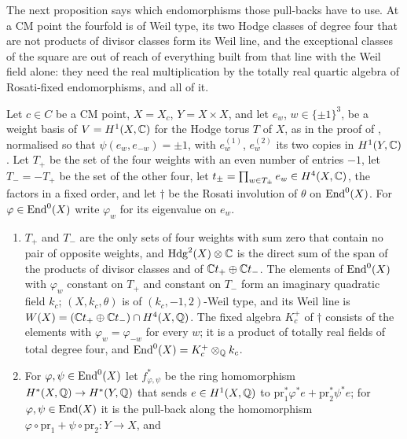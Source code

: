 The next proposition says which endomorphisms those pull-backs have to use.
At a CM point the fourfold is of Weil type, its two Hodge classes of degree
four that are not products of divisor classes form its Weil line, and the
exceptional classes of the square are out of reach of everything built from
that line with the Weil field alone: they need the real multiplication by the
totally real quartic algebra of Rosati-fixed endomorphisms, and all of it.

\begin{proposition}\label{prop:cmsource}
Let $c\in C$ be a CM point, $X=X_{c}$, $Y=X\times X$, and let $e_{w}$,
$w\in\{\pm1\}^{3}$, be a weight basis of $V=H^{1}(X,\mathbb{C})$ for the Hodge torus
$T$ of $X$, as in the proof of , normalised so that
$\psi(e_{w},e_{-w})=\pm1$, with $e^{(1)}_{w}$, $e^{(2)}_{w}$ its two copies in
$H^{1}(Y,\mathbb{C})$. Let $T_{+}$ be the set of the four weights with an even
number of entries $-1$, let $T_{-}=-T_{+}$ be the set of the other four, let
$t_{\pm}=\prod_{w\in T_{\pm}}e_{w}\in H^{4}(X,\mathbb{C})$, the factors in a fixed
order, and let $\dagger$ be the Rosati involution of $\theta$ on
$\operatorname{End}^{0}(X)$. For $\varphi\in\operatorname{End}^{0}(X)$ write $\varphi_{w}$ for its
eigenvalue on $e_{w}$.
\begin{enumerate}[label=\textup{(\roman*)},leftmargin=2.6em,itemsep=2pt]
\item $T_{+}$ and $T_{-}$ are the only sets of four weights with sum zero
  that contain no pair of opposite weights, and $\mathrm{Hdg}^{2}(X)\otimes\mathbb{C}$ is
  the direct sum of the span of the products of divisor classes and of
  $\mathbb{C} t_{+}\oplus\mathbb{C} t_{-}$. The elements of $\operatorname{End}^{0}(X)$ with
  $\varphi_{w}$ constant on $T_{+}$ and constant on $T_{-}$ form an imaginary
  quadratic field $k_{c}$; $(X,k_{c},\theta)$ is of $(k_{c},-1,2)$-Weil type,
  and its Weil line is $W(X)=(\mathbb{C} t_{+}\oplus\mathbb{C} t_{-})\cap H^{4}(X,\mathbb{Q})$.
  The fixed algebra $K_{c}^{+}$ of $\dagger$ consists of the elements with
  $\varphi_{w}=\varphi_{-w}$ for every $w$; it is a product of totally real
  fields of total degree four, and $\operatorname{End}^{0}(X)=K_{c}^{+}\otimes_{\mathbb{Q}}k_{c}$.
\item For $\varphi,\psi\in\operatorname{End}^{0}(X)$ let $f_{\varphi,\psi}^{*}$ be the ring
  homomorphism $H^{*}(X,\mathbb{Q})\to H^{*}(Y,\mathbb{Q})$ that sends $e\in H^{1}(X,\mathbb{Q})$
  to $\mathrm{pr}_{1}^{*}\varphi^{*}e+\mathrm{pr}_{2}^{*}\psi^{*}e$; for
  $\varphi,\psi\in\operatorname{End}(X)$ it is the pull-back along the homomorphism
  $\varphi\circ\mathrm{pr}_{1}+\psi\circ\mathrm{pr}_{2}\colon Y\to X$, and

\end{enumerate}
\end{proposition}

